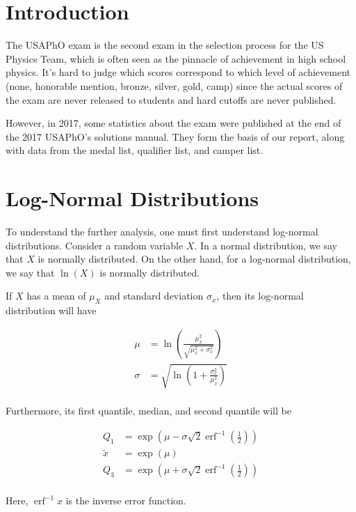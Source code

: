 \documentclass{article}
\DeclareMathOperator\erf{erf}
\begin{document}
\section{Introduction}
The USAPhO exam is the second exam in the selection process for the US Physics Team, which is often seen as the pinnacle of achievement in high school physics.
It's hard to judge which scores correspond to which level of achievement (none, honorable mention, bronze, silver, gold, camp) since the actual scores of the exam are never released to students and hard cutoffs are never published.

However, in 2017, some statistics about the exam were published at the end of the 2017 USAPhO's solutions manual.
They form the basis of our report, along with data from the medal list, qualifier list, and camper list.

\section{Log-Normal Distributions}
To understand the further analysis, one must first understand log-normal distributions.
Consider a random variable $X$.
In a normal distribution, we say that $X$ is normally distributed.
On the other hand, for a log-normal distribution, we say that $\ln(X)$ is normally distributed.

If $X$ has a mean of $\mu_X$ and standard deviation $\sigma_x$, then its log-normal distribution will have

\begin{align*}
    \mu &= \ln \left( \frac{\mu_x^2}{\sqrt{\mu_x^2 + \sigma_x^2}} \right) \\
    \sigma &= \sqrt{\ln \left (1 + \frac{\sigma_x^2}{\mu_x^2} \right)} \\
\end{align*}

Furthermore, its first quantile, median, and second quantile will be

\begin{align*}
    Q_{1} &= \exp{\left (\mu - \sigma \sqrt{2} \erf^{-1} \left ( \frac{1}{2} \right) \right)} \\
    \tilde{x} &= \exp{\left ( \mu \right)} \\
    Q_{3} &= \exp{\left (\mu + \sigma \sqrt{2} \erf^{-1} \left ( \frac{1}{2} \right) \right)} \\
\end{align*}

Here, $\erf^{-1} {x}$ is the inverse error function.
\end{document}
